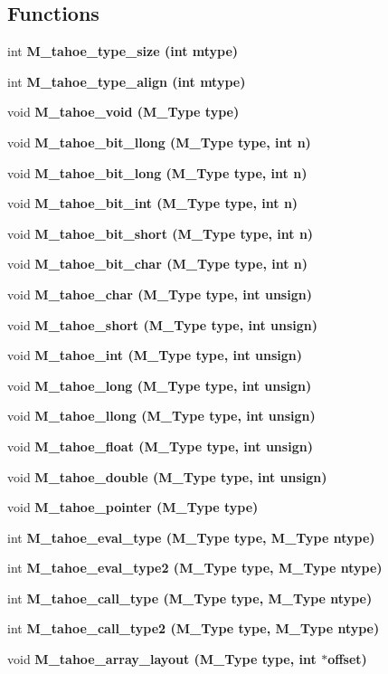 \subsection*{Functions}
\begin{CompactItemize}
\item 
int \bf{M\_\-tahoe\_\-type\_\-size} (int mtype)
\item 
int \bf{M\_\-tahoe\_\-type\_\-align} (int mtype)
\item 
void \bf{M\_\-tahoe\_\-void} (\bf{M\_\-Type} type)
\item 
void \bf{M\_\-tahoe\_\-bit\_\-llong} (\bf{M\_\-Type} type, int n)
\item 
void \bf{M\_\-tahoe\_\-bit\_\-long} (\bf{M\_\-Type} type, int n)
\item 
void \bf{M\_\-tahoe\_\-bit\_\-int} (\bf{M\_\-Type} type, int n)
\item 
void \bf{M\_\-tahoe\_\-bit\_\-short} (\bf{M\_\-Type} type, int n)
\item 
void \bf{M\_\-tahoe\_\-bit\_\-char} (\bf{M\_\-Type} type, int n)
\item 
void \bf{M\_\-tahoe\_\-char} (\bf{M\_\-Type} type, int unsign)
\item 
void \bf{M\_\-tahoe\_\-short} (\bf{M\_\-Type} type, int unsign)
\item 
void \bf{M\_\-tahoe\_\-int} (\bf{M\_\-Type} type, int unsign)
\item 
void \bf{M\_\-tahoe\_\-long} (\bf{M\_\-Type} type, int unsign)
\item 
void \bf{M\_\-tahoe\_\-llong} (\bf{M\_\-Type} type, int unsign)
\item 
void \bf{M\_\-tahoe\_\-float} (\bf{M\_\-Type} type, int unsign)
\item 
void \bf{M\_\-tahoe\_\-double} (\bf{M\_\-Type} type, int unsign)
\item 
void \bf{M\_\-tahoe\_\-pointer} (\bf{M\_\-Type} type)
\item 
int \bf{M\_\-tahoe\_\-eval\_\-type} (\bf{M\_\-Type} type, \bf{M\_\-Type} ntype)
\item 
int \bf{M\_\-tahoe\_\-eval\_\-type2} (\bf{M\_\-Type} type, \bf{M\_\-Type} ntype)
\item 
int \bf{M\_\-tahoe\_\-call\_\-type} (\bf{M\_\-Type} type, \bf{M\_\-Type} ntype)
\item 
int \bf{M\_\-tahoe\_\-call\_\-type2} (\bf{M\_\-Type} type, \bf{M\_\-Type} ntype)
\item 
void \bf{M\_\-tahoe\_\-array\_\-layout} (\bf{M\_\-Type} type, int $\ast$offset)

\end{CompactItemize}
